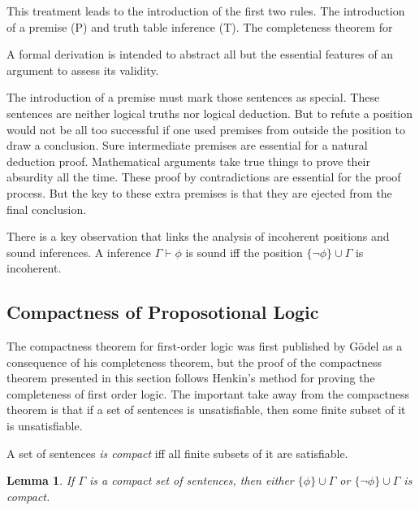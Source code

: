 \documentclass[12pt]{article}
\newtheorem{lemma}[theorem]{Lemma}
\theoremstyle{definition}
\theoremstyle{remark}
\begin{document}
This treatment leads to the introduction of the first two rules. The introduction of a premise (P) and truth table inference (T). The completeness theorem for 

A formal derivation is intended to abstract all but the essential features of an argument to assess its validity. 

The introduction of a premise must mark those sentences as special. These sentences are neither logical truths nor logical deduction. But to refute a position would not be all too successful if one used premises from outside the position to draw a conclusion. Sure intermediate premises are essential for a natural deduction proof. Mathematical arguments take true things to prove their absurdity all the time. These proof by contradictions are essential for the proof process. But the key to these extra premises is that they are ejected from the final conclusion. 

There is a key observation that links the analysis of incoherent positions and sound inferences. A inference $\Gamma \vdash \phi$ is sound iff the position $\{ \neg\phi \} \cup \Gamma$ is incoherent. 

\subsection{Compactness of Proposotional Logic}

The compactness theorem for first-order logic was first published by G{\"o}del\cite{godelcompleteness} as a consequence of his completeness theorem, but the proof of the compactness theorem presented in this section follows Henkin's method for proving the completeness of first order logic\cite{hekincompleteness}. The important take away from the compactness theorem is that if a set of sentences is unsatisfiable, then some finite subset of it is unsatisfiable.

A set of sentences \textit{is compact} iff all finite subsets of it are satisfiable. 

\begin{lemma}
	\label{lem:either-or-compact}
	If $\Gamma$ is a compact set of sentences, then either $\{ \phi \} \cup \Gamma$ or $\{ \neg\phi \} \cup \Gamma$ is compact.
\end{lemma}
\end{document}
